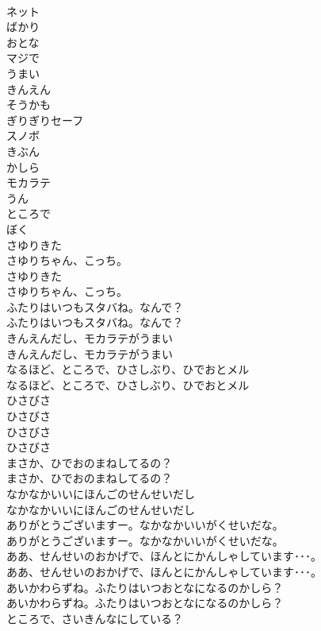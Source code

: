 \documentclass[8pt]{extreport}
\begin{document}
\begin{CJK}{UTF8}{min}
\\	ネット
\\	ばかり
\\	おとな
\\	マジで
\\	うまい
\\	きんえん
\\	そうかも
\\	ぎりぎりセーフ
\\	スノボ
\\	きぶん
\\	かしら
\\	モカラテ
\\	うん
\\	ところで
\\	ぼく
\\	さゆりきた
\\	さゆりちゃん、こっち。
\\	さゆりきた
\\	さゆりちゃん、こっち。
\\	ふたりはいつもスタバね。なんで？
\\	ふたりはいつもスタバね。なんで？
\\	きんえんだし、モカラテがうまい
\\	きんえんだし、モカラテがうまい
\\	なるほど、ところで、ひさしぶり、ひでおとメル
\\	なるほど、ところで、ひさしぶり、ひでおとメル
\\	ひさびさ
\\	ひさびさ
\\	ひさびさ
\\	ひさびさ
\\	まさか、ひでおのまねしてるの？
\\	まさか、ひでおのまねしてるの？
\\	なかなかいいにほんごのせんせいだし
\\	なかなかいいにほんごのせんせいだし
\\	ありがとうございますー。なかなかいいがくせいだな。
\\	ありがとうございますー。なかなかいいがくせいだな。
\\	ああ、せんせいのおかげで、ほんとにかんしゃしています･･･。
\\	ああ、せんせいのおかげで、ほんとにかんしゃしています･･･。
\\	あいかわらずね。ふたりはいつおとなになるのかしら？
\\	あいかわらずね。ふたりはいつおとなになるのかしら？
\\	ところで、さいきんなにしている？

\end{CJK}
\end{document}
